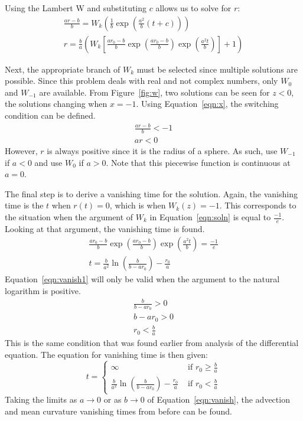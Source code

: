 \documentclass[journal]{IEEEtran}
\begin{document}
Using the Lambert W and substituting $c$ allows us to solve for $r$:
\begin{eqnarray}
  \frac{ar-b}{b} = W_k\left(\frac{1}{b}\exp\left(\frac{a^2}{b}(t+c)\right)\right) \\
  \label{eqn:soln}
  r = \frac{b}{a}\left(W_k\left[\frac{ar_0-b}{b} \exp\left(\frac{ar_0-b}{b}\right)\exp\left(\frac{a^2t}{b}\right)\right] + 1\right)
\end{eqnarray}

Next, the appropriate branch of $W_k$ must be selected since multiple solutions are possible.
Since this problem deals with real and not complex numbers, only $W_0$ and $W_{-1}$ are available.
From Figure~\ref{fig:w}, two solutions can be seen for $z < 0$, the solutions changing when $x = -1$.
Using Equation~\ref{eqn:x}, the switching condition can be defined.
\begin{eqnarray}
  \frac{ar-b}{b} < -1 \\
  ar < 0
\end{eqnarray}
However, $r$ is always positive since it is the radius of a sphere.
As such, use $W_{-1}$ if $a<0$ and use $W_0$ if $a>0$.
Note that this piecewise function is continuous at $a=0$.

The final step is to derive a vanishing time for the solution.
Again, the vanishing time is the $t$ when $r(t)=0$, which is when $W_k(z) = -1$.
This corresponds to the situation when the argument of $W_k$ in Equation~\ref{eqn:soln} is equal to $\frac{-1}{e}$.
Looking at that argument, the vanishing time is found.
\begin{eqnarray}
  \frac{ar_0-b}{b} \exp\left(\frac{ar_0-b}{b}\right)\exp\left(\frac{a^2t}{b}\right) = \frac{-1}{e} \\
  \label{eqn:vanish1}
  t = \frac{b}{a^2} \ln\left(\frac{b}{b-ar_0}\right) - \frac{r_0}{a}
\end{eqnarray}
Equation~\ref{eqn:vanish1} will only be valid when the argument to the natural logarithm is positive.
\begin{eqnarray}
  \frac{b}{b-ar_0} > 0 \\
  b - ar_0 > 0 \\
  r_0 < \frac{b}{a}
\end{eqnarray}
This is the same condition that was found earlier from analysis of the differential equation.
The equation for vanishing time is then given:
\begin{equation}
  \label{eqn:vanish}
  t = \left\{
    \begin{matrix}
      \infty & \text{ if } r_0 \geq \frac{b}{a} \\
      \frac{b}{a^2} \ln\left(\frac{b}{b-ar_0}\right) - \frac{r_0}{a} & \text{ if } r_0 < \frac{b}{a}
    \end{matrix}
  \right.
\end{equation}
Taking the limits as $a \rightarrow 0$ or as $b \rightarrow 0$ of Equation~\ref{eqn:vanish}, the advection and mean curvature vanishing times from before can be found.
\end{document}
